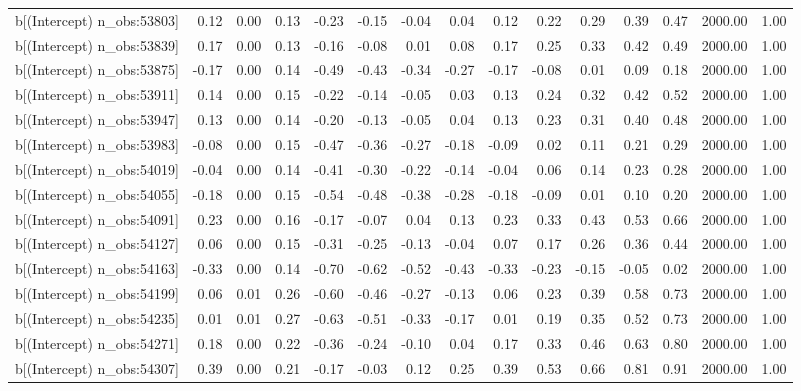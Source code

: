 \begin{table}[ht]
\begin{tabular}{rrrrrrrrrrrrrrr}
  b[(Intercept) n\_obs:53803] & 0.12 & 0.00 & 0.13 & -0.23 & -0.15 & -0.04 & 0.04 & 0.12 & 0.22 & 0.29 & 0.39 & 0.47 & 2000.00 & 1.00 \\ 
  b[(Intercept) n\_obs:53839] & 0.17 & 0.00 & 0.13 & -0.16 & -0.08 & 0.01 & 0.08 & 0.17 & 0.25 & 0.33 & 0.42 & 0.49 & 2000.00 & 1.00 \\ 
  b[(Intercept) n\_obs:53875] & -0.17 & 0.00 & 0.14 & -0.49 & -0.43 & -0.34 & -0.27 & -0.17 & -0.08 & 0.01 & 0.09 & 0.18 & 2000.00 & 1.00 \\ 
  b[(Intercept) n\_obs:53911] & 0.14 & 0.00 & 0.15 & -0.22 & -0.14 & -0.05 & 0.03 & 0.13 & 0.24 & 0.32 & 0.42 & 0.52 & 2000.00 & 1.00 \\ 
  b[(Intercept) n\_obs:53947] & 0.13 & 0.00 & 0.14 & -0.20 & -0.13 & -0.05 & 0.04 & 0.13 & 0.23 & 0.31 & 0.40 & 0.48 & 2000.00 & 1.00 \\ 
  b[(Intercept) n\_obs:53983] & -0.08 & 0.00 & 0.15 & -0.47 & -0.36 & -0.27 & -0.18 & -0.09 & 0.02 & 0.11 & 0.21 & 0.29 & 2000.00 & 1.00 \\ 
  b[(Intercept) n\_obs:54019] & -0.04 & 0.00 & 0.14 & -0.41 & -0.30 & -0.22 & -0.14 & -0.04 & 0.06 & 0.14 & 0.23 & 0.28 & 2000.00 & 1.00 \\ 
  b[(Intercept) n\_obs:54055] & -0.18 & 0.00 & 0.15 & -0.54 & -0.48 & -0.38 & -0.28 & -0.18 & -0.09 & 0.01 & 0.10 & 0.20 & 2000.00 & 1.00 \\ 
  b[(Intercept) n\_obs:54091] & 0.23 & 0.00 & 0.16 & -0.17 & -0.07 & 0.04 & 0.13 & 0.23 & 0.33 & 0.43 & 0.53 & 0.66 & 2000.00 & 1.00 \\ 
  b[(Intercept) n\_obs:54127] & 0.06 & 0.00 & 0.15 & -0.31 & -0.25 & -0.13 & -0.04 & 0.07 & 0.17 & 0.26 & 0.36 & 0.44 & 2000.00 & 1.00 \\ 
  b[(Intercept) n\_obs:54163] & -0.33 & 0.00 & 0.14 & -0.70 & -0.62 & -0.52 & -0.43 & -0.33 & -0.23 & -0.15 & -0.05 & 0.02 & 2000.00 & 1.00 \\ 
  b[(Intercept) n\_obs:54199] & 0.06 & 0.01 & 0.26 & -0.60 & -0.46 & -0.27 & -0.13 & 0.06 & 0.23 & 0.39 & 0.58 & 0.73 & 2000.00 & 1.00 \\ 
  b[(Intercept) n\_obs:54235] & 0.01 & 0.01 & 0.27 & -0.63 & -0.51 & -0.33 & -0.17 & 0.01 & 0.19 & 0.35 & 0.52 & 0.73 & 2000.00 & 1.00 \\ 
  b[(Intercept) n\_obs:54271] & 0.18 & 0.00 & 0.22 & -0.36 & -0.24 & -0.10 & 0.04 & 0.17 & 0.33 & 0.46 & 0.63 & 0.80 & 2000.00 & 1.00 \\ 
  b[(Intercept) n\_obs:54307] & 0.39 & 0.00 & 0.21 & -0.17 & -0.03 & 0.12 & 0.25 & 0.39 & 0.53 & 0.66 & 0.81 & 0.91 & 2000.00 & 1.00 \\ 

\end{tabular}
\end{table}
